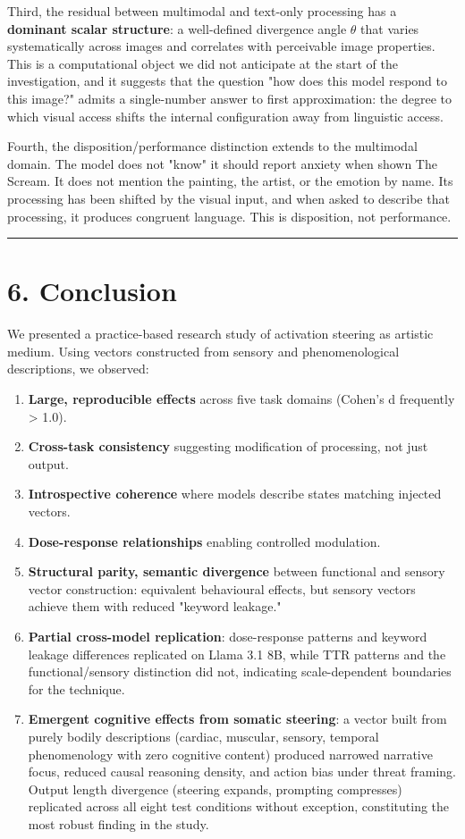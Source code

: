 \documentclass[11pt,a4paper]{article}
\begin{document}
Third, the residual between multimodal and text-only processing has a \textbf{dominant scalar structure}: a well-defined divergence angle $\theta$ that varies systematically across images and correlates with perceivable image properties. This is a computational object we did not anticipate at the start of the investigation, and it suggests that the question "how does this model respond to this image?" admits a single-number answer to first approximation: the degree to which visual access shifts the internal configuration away from linguistic access.

Fourth, the disposition/performance distinction extends to the multimodal domain. The model does not "know" it should report anxiety when shown The Scream. It does not mention the painting, the artist, or the emotion by name. Its processing has been shifted by the visual input, and when asked to describe that processing, it produces congruent language. This is disposition, not performance.

\bigskip\hrule\bigskip

\section*{6. Conclusion}

We presented a practice-based research study of activation steering as artistic medium. Using vectors constructed from sensory and phenomenological descriptions, we observed:

\begin{enumerate}[leftmargin=*]
  \item \textbf{Large, reproducible effects} across five task domains (Cohen's d frequently > 1.0).
  \item \textbf{Cross-task consistency} suggesting modification of processing, not just output.
  \item \textbf{Introspective coherence} where models describe states matching injected vectors.
  \item \textbf{Dose-response relationships} enabling controlled modulation.
  \item \textbf{Structural parity, semantic divergence} between functional and sensory vector construction: equivalent behavioural effects, but sensory vectors achieve them with reduced "keyword leakage."
  \item \textbf{Partial cross-model replication}: dose-response patterns and keyword leakage differences replicated on Llama 3.1 8B, while TTR patterns and the functional/sensory distinction did not, indicating scale-dependent boundaries for the technique.
  \item \textbf{Emergent cognitive effects from somatic steering}: a vector built from purely bodily descriptions (cardiac, muscular, sensory, temporal phenomenology with zero cognitive content) produced narrowed narrative focus, reduced causal reasoning density, and action bias under threat framing. Output length divergence (steering expands, prompting compresses) replicated across all eight test conditions without exception, constituting the most robust finding in the study.
\end{enumerate}
\end{document}
